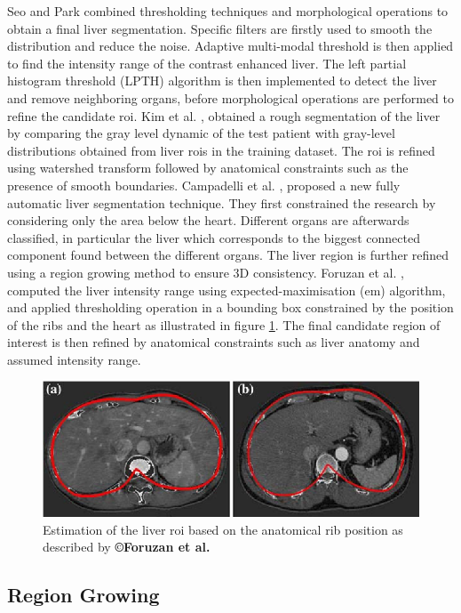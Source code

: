 Seo and Park \cite{Seo2005} 
combined thresholding techniques and morphological operations to obtain
a final liver segmentation. Specific filters are firstly used to smooth the
distribution and reduce the noise. Adaptive multi-modal threshold is
then applied to find the intensity range of the contrast enhanced liver.
The left partial histogram threshold (LPTH) algorithm is then
implemented to detect the liver and remove neighboring organs, before
morphological operations are performed to refine the candidate \ac{roi}.
Kim et al. \cite{Kim2007}, obtained a rough segmentation of the liver by comparing the gray
level dynamic of the test patient with gray-level distributions obtained
from liver \ac{roi}s in the training dataset. The \ac{roi} is refined using
watershed transform followed by anatomical constraints such as the
presence of smooth boundaries.
Campadelli et al. \cite{Campadelli2009}, proposed a new fully automatic liver segmentation
technique. They first constrained the research by considering only the
area below the heart. Different organs are afterwards classified, in
particular the liver which corresponds to the biggest connected
component found between the different organs. The liver region is
further refined using a region growing method to ensure 3D consistency.
Foruzan et al. \cite{Foruzan2009}, computed the liver intensity range using
expected-maximisation (\ac{em}) algorithm, and applied thresholding operation
in a bounding box constrained by the position of the ribs and the heart
as illustrated in figure \ref{ForuzanFig3}. The final candidate region of interest is then
refined by anatomical constraints such as liver anatomy and assumed
intensity range.

\begin{figure} [ht!]
	\centering
	\includegraphics[width=0.7\linewidth]{images/Foruzan2009_Fig3}
	\caption{Estimation of the liver \ac{roi} based on the anatomical rib position as described by \textbf{©Foruzan et al. \cite{Foruzan2009}}}
	\label{ForuzanFig3}
\end{figure}


\subsection{Region Growing}

